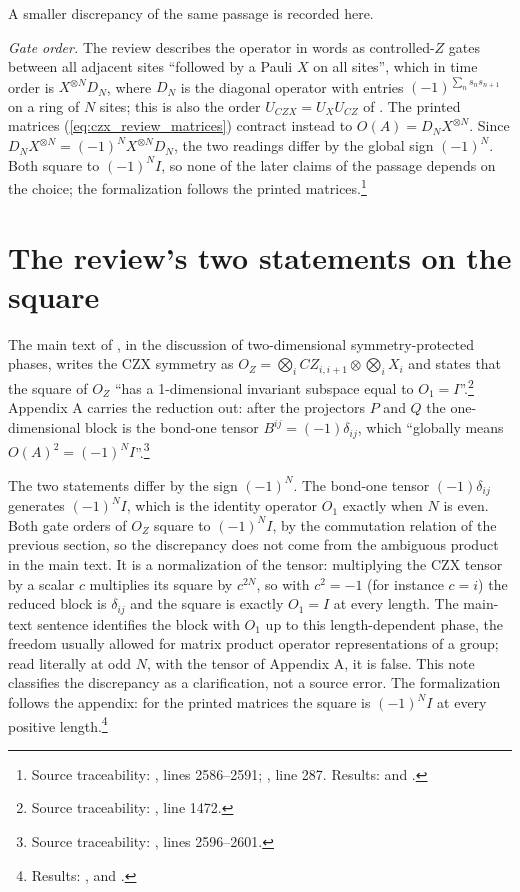 \documentclass{article}
\begin{document}
A smaller discrepancy of the same passage is recorded here.

\emph{Gate order.} The review describes the operator in words as
controlled-$Z$ gates between all adjacent sites ``followed by a Pauli $X$ on
all sites'', which in time order is $X^{\otimes N}D_N$, where $D_N$ is the
diagonal operator with entries $(-1)^{\sum_n s_ns_{n+1}}$ on a ring of $N$
sites; this is also the order $U_{CZX}=U_XU_{CZ}$ of \cite{ChenLiuWen2011CZX}.
The printed matrices (\ref{eq:czx_review_matrices}) contract instead to
$O(A)=D_NX^{\otimes N}$. Since $D_NX^{\otimes N}=(-1)^NX^{\otimes N}D_N$,
the two readings differ by the global sign $(-1)^N$. Both square to
$(-1)^NI$, so none of the later claims of the passage depends on the
choice; the formalization follows the printed matrices.\footnote{Source
    traceability: , lines
    2586--2591; ,
    line 287. Results:  and
    .}

\section{The review's two statements on the square}
The main text of \cite{Cirac2021Matrix}, in the discussion of
two-dimensional symmetry-protected phases, writes the CZX symmetry as
$O_Z=\bigotimes_i CZ_{i,i+1}\otimes\bigotimes_i X_i$ and states that the
square of $O_Z$ ``has a 1-dimensional invariant subspace equal to
$O_1=I$''.\footnote{Source traceability:
    , line 1472.}
Appendix A carries the reduction out: after the projectors $P$ and $Q$
the one-dimensional block is the bond-one tensor $B^{ij}=(-1)\delta_{ij}$,
which ``globally means $O(A)^2=(-1)^NI$''.\footnote{Source traceability:
    , lines 2596--2601.}

The two statements differ by the sign $(-1)^N$. The bond-one tensor
$(-1)\delta_{ij}$ generates $(-1)^NI$, which is the identity operator
$O_1$ exactly when $N$ is even. Both gate orders of $O_Z$ square to
$(-1)^NI$, by the commutation relation of the previous section, so the
discrepancy does not come from the ambiguous product in the main text.
It is a normalization of the tensor: multiplying the CZX tensor by a
scalar $c$ multiplies its square by $c^{2N}$, so with $c^2=-1$ (for
instance $c=i$) the reduced block is $\delta_{ij}$ and the square is
exactly $O_1=I$ at every length. The main-text sentence identifies the
block with $O_1$ up to this length-dependent phase, the freedom usually
allowed for matrix product operator representations of a group; read
literally at odd $N$, with the tensor of Appendix A, it is false. This
note classifies the discrepancy as a clarification, not a source error.
The formalization follows the appendix: for the printed matrices the
square is $(-1)^NI$ at every positive length.\footnote{Results:
    ,
     and
    .}



\end{document}
